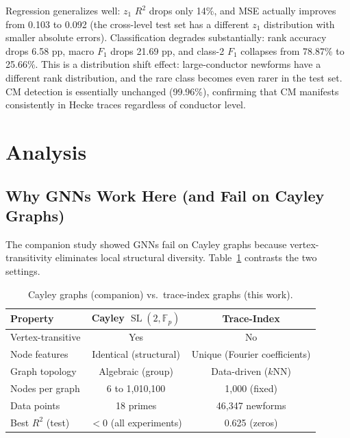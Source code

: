 \documentclass[11pt]{article}
\DeclareMathOperator{\SL}{SL}
\newcommand{\Fp}{\mathbb{F}_p}
\begin{document}
Regression generalizes well: $z_1$ $R^2$ drops only 14\%, and MSE actually improves from 0.103 to 0.092 (the cross-level test set has a different $z_1$ distribution with smaller absolute errors). Classification degrades substantially: rank accuracy drops 6.58 pp, macro $F_1$ drops 21.69 pp, and class-2 $F_1$ collapses from 78.87\% to 25.66\%. This is a distribution shift effect: large-conductor newforms have a different rank distribution, and the rare class becomes even rarer in the test set. CM detection is essentially unchanged (99.96\%), confirming that CM manifests consistently in Hecke traces regardless of conductor level.

\section{Analysis}
\label{sec:analysis}

\subsection{Why GNNs Work Here (and Fail on Cayley Graphs)}

The companion study \citep{companion2025} showed GNNs fail on Cayley graphs because vertex-transitivity eliminates local structural diversity. Table~\ref{tab:cayley-vs-trace} contrasts the two settings.

\begin{table}[t]
\centering
\caption{Cayley graphs (companion) vs.\ trace-index graphs (this work).}
\label{tab:cayley-vs-trace}
\begin{tabular}{@{}lcc@{}}
\toprule
Property & Cayley $\SL(2,\Fp)$ & Trace-Index \\
\midrule
Vertex-transitive & Yes & No \\
Node features & Identical (structural) & Unique (Fourier coefficients) \\
Graph topology & Algebraic (group) & Data-driven ($k$NN) \\
Nodes per graph & 6 to 1,010,100 & 1,000 (fixed) \\
Data points & 18 primes & 46,347 newforms \\
Best $R^2$ (test) & $<0$ (all experiments) & 0.625 (zeros) \\
\bottomrule
\end{tabular}
\end{table}
\end{document}
